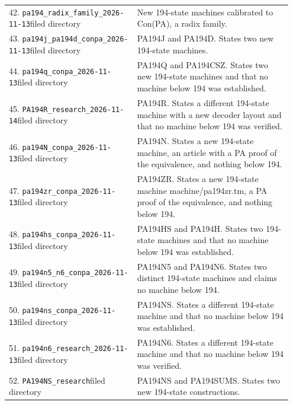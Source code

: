 \begin{longtable}{@{}p{0.43\linewidth}p{0.52\linewidth}@{}}
42. \nolinkurl{pa194_radix_family_2026-11-13}\newline filed directory&New 194-state machines calibrated to Con(PA), a radix family.\\[5pt]
43. \nolinkurl{pa194j_pa194d_conpa_2026-11-13}\newline filed directory&PA194J and PA194D. States two new 194-state machines.\\[5pt]
44. \nolinkurl{pa194q_conpa_2026-11-13}\newline filed directory&PA194Q and PA194CSZ. States two new 194-state machines and that no machine below 194 was established.\\[5pt]
45. \nolinkurl{PA194R_research_2026-11-14}\newline filed directory&PA194R. States a different 194-state machine with a new decoder layout and that no machine below 194 was verified.\\[5pt]
46. \nolinkurl{pa194N_conpa_2026-11-13}\newline filed directory&PA194N. States a new 194-state machine, an article with a PA proof of the equivalence, and nothing below 194.\\[5pt]
47. \nolinkurl{pa194zr_conpa_2026-11-13}\newline filed directory&PA194ZR. States a new 194-state machine machine/pa194zr.tm, a PA proof of the equivalence, and nothing below 194.\\[5pt]
48. \nolinkurl{pa194hs_conpa_2026-11-13}\newline filed directory&PA194HS and PA194H. States two 194-state machines and that no machine below 194 was established.\\[5pt]
49. \nolinkurl{pa194n5_n6_conpa_2026-11-13}\newline filed directory&PA194N5 and PA194N6. States two distinct 194-state machines and claims no machine below 194.\\[5pt]
50. \nolinkurl{pa194ns_conpa_2026-11-13}\newline filed directory&PA194NS. States a different 194-state machine and that no machine below 194 was established.\\[5pt]
51. \nolinkurl{pa194n6_research_2026-11-13}\newline filed directory&PA194N6. States a different 194-state machine and that no machine below 194 was verified.\\[5pt]
52. \nolinkurl{PA194NS_research}\newline filed directory&PA194NS and PA194SUMS. States two new 194-state constructions.\\[5pt]

\end{longtable}
